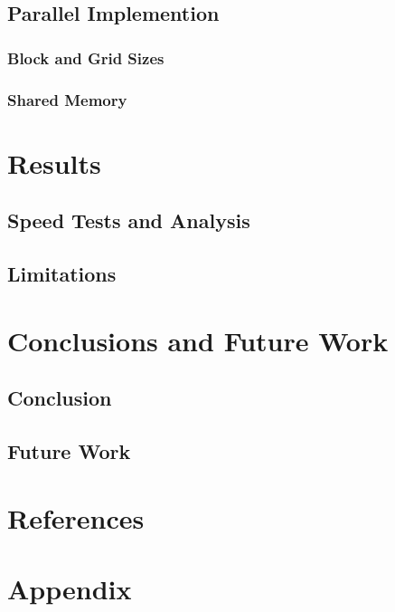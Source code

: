 \documentclass{report}
\begin{document}
	\section{Parallel Implemention}
		\subsection{Block and Grid Sizes}
		\subsection{Shared Memory}
	

\chapter{Results}
	\section{Speed Tests and Analysis}
	\section{Limitations}
	

\chapter{Conclusions and Future Work}
	\section{Conclusion}
	\section{Future Work}
	

\chapter{References}

\chapter{Appendix}





\end{document}
